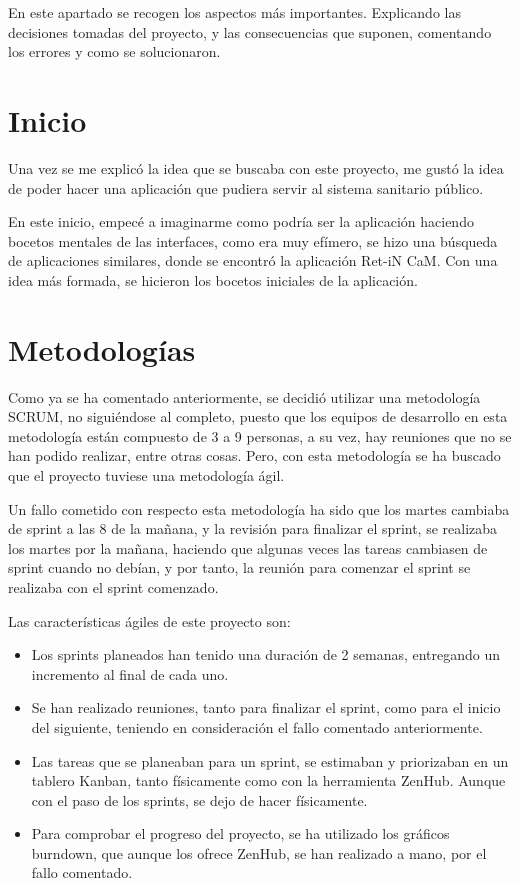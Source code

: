 
En este apartado se recogen los aspectos más importantes. Explicando las decisiones tomadas del proyecto, y las consecuencias que suponen, comentando los errores y como se solucionaron.

\section{Inicio}

Una vez se me explicó la idea que se buscaba con este proyecto, me gustó la idea de poder hacer una aplicación que pudiera servir al sistema sanitario público.

En este inicio, empecé a imaginarme como podría ser la aplicación haciendo bocetos mentales de las interfaces, como era muy efímero, se hizo una búsqueda de aplicaciones similares, donde se encontró la aplicación Ret-iN CaM. Con una idea más formada, se hicieron los bocetos iniciales de la aplicación.

\section{Metodologías}

Como ya se ha comentado anteriormente, se decidió utilizar una metodología SCRUM, no siguiéndose al completo, puesto que los equipos de desarrollo en esta metodología están compuesto de 3 a 9 personas, a su vez, hay reuniones que no se han podido realizar, entre otras cosas. Pero, con esta metodología se ha buscado que el proyecto tuviese una metodología ágil.

Un fallo cometido con respecto esta metodología ha sido que los martes cambiaba de sprint a las 8 de la mañana, y la revisión para finalizar el sprint, se realizaba los martes por la mañana, haciendo que algunas veces las tareas cambiasen de sprint cuando no debían, y por tanto, la reunión para comenzar el sprint se realizaba con el sprint comenzado.

Las características ágiles de este proyecto son:
\begin{itemize}
    \item Los sprints planeados han tenido una duración de 2 semanas, entregando un incremento al final de cada uno.
    \item Se han realizado reuniones, tanto para finalizar el sprint, como para el inicio del siguiente, teniendo en consideración el fallo comentado anteriormente.
    \item Las tareas que se planeaban para un sprint, se estimaban y priorizaban en un tablero Kanban, tanto físicamente como con la herramienta ZenHub. Aunque con el paso de los sprints, se dejo de hacer físicamente.
    \item Para comprobar el progreso del proyecto, se ha utilizado los gráficos burndown, que aunque los ofrece ZenHub, se han realizado a mano, por el fallo comentado.
\end{itemize}

